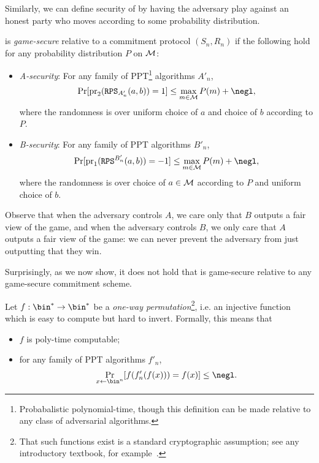 \noindent
Similarly, we can define security of  by having
the adversary play against an honest party who moves according to some
probability distribution.

\begin{dfn}
	 is \emph{game-secure} relative to a commitment
	protocol $(S_n,R_n)$ if the following hold for any probability distribution
	$P$ on $\mathcal{M}$:
	\begin{itemize}
		\item \emph{A-security}: For any family of PPT\footnote{Probabalistic
			      polynomial-time, though this definition can be made relative to any class
			      of adversarial algorithms.} algorithms $A'_n$,\[
			      \Pr[\pr_2(\alg{RPS}_{A'_n}(a, b)) = 1] \leq \max_{m\in\cM}P(m) + \negl,
		      \]
		      where the randomness is over uniform choice of $a$ and choice of $b$
		      according to $P$.
		\item \emph{B-security}: For any family of PPT algorithms $B'_n$,\[
			      \Pr[\pr_1(\alg{RPS}^{B'_n}(a, b)) = -1] \leq \max_{m\in\cM}P(m) + \negl,
		      \]
		      where the randomness is over choice of $a\in\mathcal{M}$ according to $P$ and
		      uniform choice of $b$.
	\end{itemize}
\end{dfn}

\noindent
Observe that when the adversary controls $A$, we care only that $B$ outputs a
fair view of the game, and when the adversary controls $B$, we only care that
$A$ outputs a fair view of the game: we can never prevent the adversary from
just outputting that they win.

\vspace{1em}

Surprisingly, as we now show, it does not hold that  is
game-secure relative to any game-secure commitment scheme.

Let $f:\bin^*\rightarrow\bin^*$ be a \emph{one-way permutation}\footnote{That such functions exist is a
	standard cryptographic assumption; see any introductory textbook, for
	example~\cite[Section 7.1]{katz-lindell-2014}.}, i.e. an injective function
which is easy to compute but hard to invert. Formally,
this means that\begin{itemize}
	\item $f$ is poly-time computable;
	\item for any family of PPT algorithms $f'_n$, \[
		      \Pr_{x\leftarrow\bin^n}[f(f'_n(f(x))) = f(x)] \leq \negl.
	      \]
\end{itemize}

